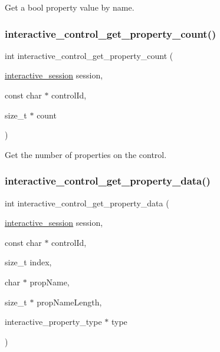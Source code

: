 Get a {\ttfamily bool} property value by name. 

\mbox{\label{group___interactivity_ga3b852e6de50a4af31a8032fcc7094328}} 
\subsubsection{\texorpdfstring{interactive\+\_\+control\+\_\+get\+\_\+property\+\_\+count()}{interactive\_control\_get\_property\_count()}}
{\footnotesize\ttfamily int interactive\+\_\+control\+\_\+get\+\_\+property\+\_\+count (\begin{DoxyParamCaption}\item[{\mbox{\hyperlink{group___interactivity_ga6d8819d38b8dc8994a2299cf22a65a31}{interactive\+\_\+session}}}]{session,  }\item[{const char $\ast$}]{control\+Id,  }\item[{size\+\_\+t $\ast$}]{count }\end{DoxyParamCaption})}



Get the number of properties on the control. 

\mbox{\label{group___interactivity_ga92ecffab048b677c393b2e1a7ee53459}} 
\subsubsection{\texorpdfstring{interactive\+\_\+control\+\_\+get\+\_\+property\+\_\+data()}{interactive\_control\_get\_property\_data()}}
{\footnotesize\ttfamily int interactive\+\_\+control\+\_\+get\+\_\+property\+\_\+data (\begin{DoxyParamCaption}\item[{\mbox{\hyperlink{group___interactivity_ga6d8819d38b8dc8994a2299cf22a65a31}{interactive\+\_\+session}}}]{session,  }\item[{const char $\ast$}]{control\+Id,  }\item[{size\+\_\+t}]{index,  }\item[{char $\ast$}]{prop\+Name,  }\item[{size\+\_\+t $\ast$}]{prop\+Name\+Length,  }\item[{interactive\+\_\+property\+\_\+type $\ast$}]{type }\end{DoxyParamCaption})}



